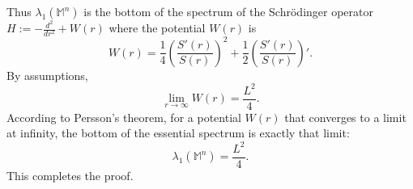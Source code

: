 \documentclass[a4paper,11pt,reqno]{amsart}
\theoremstyle{plain}
\numberwithin{equation}{section} \allowdisplaybreaks
\newcommand{\m}{\mathbb{M}^n}
\begin{document}
Thus $\lambda_1(\m)$ is the bottom of the spectrum of the Schr\"odinger operator $H:=-\frac{d^2}{dr^2}+W(r)$ where the potential $W(r)$ is
\begin{equation*}
    W(r)=\frac{1}{4}\left(\frac{S'(r)}{S(r)}\right)^2+\frac{1}{2}\left(\frac{S'(r)}{S(r)}\right)'.
\end{equation*}
    By assumptions,
    \begin{equation*}
        \lim_{r \to \infty}W(r)=\frac{L^2}{4}.
    \end{equation*}
    According to Persson's theorem, for a potential $W(r)$ that converges to a limit at infinity, the bottom of the essential spectrum is exactly that limit:
    \begin{equation*}
        \lambda_1(\m)= \frac{L^2}{4}.
    \end{equation*}
    This completes the proof.
\end{document}
